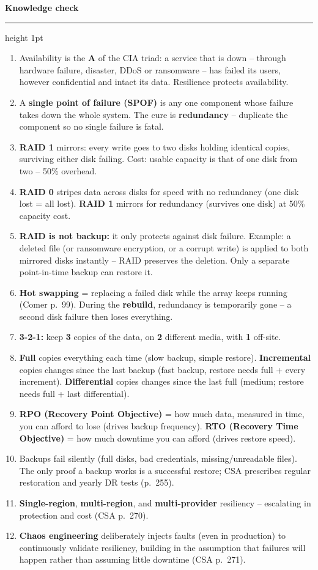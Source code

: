 \documentclass[11pt]{article}
\newcommand{\wbsection}[1]{\par\vspace{11pt}\noindent
  {\large\bfseries\color{kred}#1}\par\vspace{2pt}
  {\color{kred!35}\hrule height 1pt}\par\vspace{6pt}}
\renewcommand{\emph}[1]{\textup{#1}}
\begin{document}
\wbsection{Knowledge check}
\begin{enumerate}
\item Availability is the \textbf{A} of the CIA triad: a service that is down -- through hardware
      failure, disaster, DDoS or ransomware -- has failed its users, however confidential and intact its
      data. Resilience protects availability.
\item A \textbf{single point of failure (SPOF)} is any one component whose failure takes down the whole
      system. The cure is \textbf{redundancy} -- duplicate the component so no single failure is fatal.
\item \textbf{RAID 1} mirrors: every write goes to two disks holding identical copies, surviving either
      disk failing. Cost: usable capacity is that of \emph{one} disk from two -- 50\% overhead.
\item \textbf{RAID 0} stripes data across disks for speed with \emph{no} redundancy (one disk lost =
      all lost). \textbf{RAID 1} mirrors for redundancy (survives one disk) at 50\% capacity cost.
\item \textbf{RAID is not backup:} it only protects against \emph{disk failure}. Example: a deleted file
      (or ransomware encryption, or a corrupt write) is applied to \emph{both} mirrored disks instantly
      -- RAID preserves the deletion. Only a separate point-in-time backup can restore it.
\item \textbf{Hot swapping} = replacing a failed disk while the array keeps running (Comer p.~99). During
      the \textbf{rebuild}, redundancy is temporarily gone -- a second disk failure then loses everything.
\item \textbf{3-2-1:} keep \textbf{3} copies of the data, on \textbf{2} different media, with \textbf{1}
      off-site.
\item \textbf{Full} copies everything each time (slow backup, simple restore). \textbf{Incremental}
      copies changes since the \emph{last} backup (fast backup, restore needs full + every increment).
      \textbf{Differential} copies changes since the last \emph{full} (medium; restore needs full + last
      differential).
\item \textbf{RPO (Recovery Point Objective)} = how much data, measured in time, you can afford to lose
      (drives backup frequency). \textbf{RTO (Recovery Time Objective)} = how much downtime you can
      afford (drives restore speed).
\item Backups fail silently (full disks, bad credentials, missing/unreadable files). The only proof a
      backup works is a successful \emph{restore}; CSA prescribes regular restoration and yearly DR tests
      (p.~255).
\item \textbf{Single-region}, \textbf{multi-region}, and \textbf{multi-provider} resiliency -- escalating
      in protection and cost (CSA p.~270).
\item \textbf{Chaos engineering} deliberately injects faults (even in production) to continuously
      validate resiliency, building in the assumption that failures \emph{will} happen rather than
      assuming little downtime (CSA p.~271).
\end{enumerate}
\end{document}
